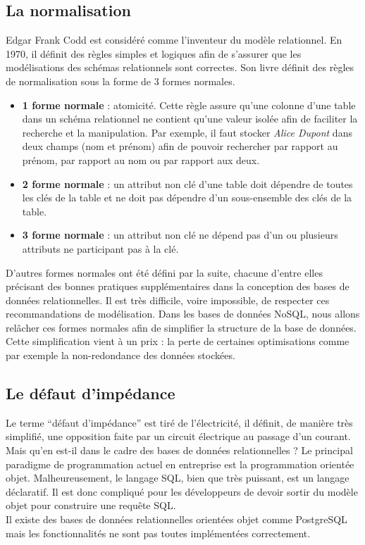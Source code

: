 \subsection{La normalisation}

    Edgar Frank Codd est considéré comme l'inventeur du modèle relationnel. En 1970, il définit des règles simples et logiques afin de s'assurer que les modélisations des schémas relationnels sont correctes\cite{Wikipedia_Edgar_Frank_Codd}. Son livre définit des règles de normalisation sous la forme de 3 formes normales.
    \vspace{10px}
    \begin{itemize}
      \item \textbf{1\iere{} forme normale} : atomicité. Cette règle assure qu'une colonne d'une table dans un schéma relationnel ne contient qu'une valeur isolée afin de faciliter la recherche et la manipulation. Par exemple, il faut stocker \textit{Alice Dupont} dans deux champs (nom et prénom) afin de pouvoir rechercher par rapport au prénom, par rapport au nom ou par rapport aux deux.
      \item \textbf{2\ieme{} forme normale} : un attribut non clé d'une table doit dépendre de toutes les clés de la table et ne doit pas dépendre d'un sous-ensemble des clés de la table.
      \item \textbf{3\ieme{} forme normale} : un attribut non clé ne dépend pas d'un ou plusieurs attributs ne participant pas à la clé.
    \end{itemize}
    \vspace{20px}
    D'autres formes normales ont été défini par la suite, chacune d'entre elles précisant des bonnes pratiques supplémentaires dans la conception des bases de données relationnelles. Il est très difficile, voire impossible, de respecter ces recommandations de modélisation. Dans les bases de données NoSQL, nous allons relâcher ces formes normales afin de simplifier la structure de la base de données. Cette simplification vient à un prix : la perte de certaines optimisations comme par exemple la non-redondance des données stockées.

\subsection{Le défaut d'impédance}

  Le terme \enquote{défaut d'impédance} est tiré de l'électricité, il définit, de manière très simplifié, une opposition faite par un circuit électrique au passage d'un courant. Mais qu'en est-il dans le cadre des bases de données relationnelles ? Le principal paradigme de programmation actuel en entreprise est la programmation orientée objet. Malheureusement, le langage SQL, bien que très puissant, est un langage déclaratif. Il est donc compliqué pour les développeurs de devoir sortir du modèle objet pour construire une requête SQL.\\ Il existe des bases de données relationnelles orientées objet comme PostgreSQL mais les fonctionnalités ne sont pas toutes implémentées correctement.

